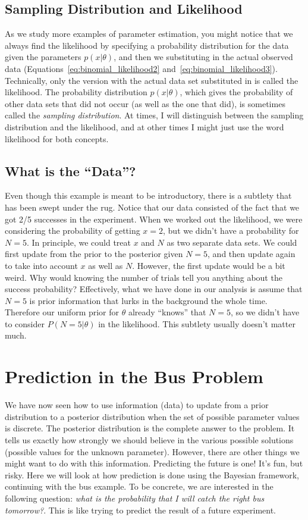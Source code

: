 \subsection{Sampling Distribution and Likelihood}
As we study more examples of parameter estimation, you might notice that
we always find the likelihood by specifying a probability distribution for
the data given the parameters $p(x|\theta)$, and then we substituting in the
actual observed data (Equations~\ref{eq:binomial_likelihood2}
and~\ref{eq:binomial_likelihood3}). Technically, only the version with the
actual data set substituted in is called the likelihood. The probability
distribution $p(x|\theta)$, which gives the probability of other data sets
that did not occur (as well as the one that did), is sometimes called the
{\it sampling distribution}. At times, I will distinguish between the sampling
distribution and the likelihood, and at other times I might just use the word
likelihood for both concepts.

\subsection{What is the ``Data''?}
Even though this example is meant to be introductory, there is a subtlety
that has been swept under the rug. Notice that our data consisted of the fact
that we got 2/5 successes in the experiment. When we worked out the likelihood,
we were considering the probability of getting $x=2$, but we didn't have a
probability for $N=5$. In principle, we could treat $x$ and $N$ as two separate data sets.
We could first update from the prior to the posterior given $N=5$, and then update
again to take into account $x$ as well as $N$. However, the first update would
be a bit weird. Why would knowing the number of trials tell you anything about
the success probability? Effectively, what we have done in our analysis is assume that $N=5$ is prior information that lurks in the background the whole time. Therefore our uniform prior for $\theta$ already ``knows''
that $N=5$, so we didn't have to consider $P(N=5|\theta)$ in the likelihood.
This subtlety usually doesn't matter much.

\section{Prediction in the Bus Problem}\label{sec:prediction_bus_problem}
We have now seen how to use information (data) to update from a prior distribution
to a posterior distribution when the set of possible parameter values is
discrete. The
posterior distribution is the complete answer to the problem. It tells us exactly
how strongly we should believe in the various possible solutions (possible
values for the unknown parameter). However, there
are other things we might want to do with this information. Predicting the future
is one! It's fun, but risky. Here we will look at how prediction is done using the Bayesian
framework, continuing with the bus example. To be concrete, we are interested
in the following question: {\it what is the probability that I will catch the
right bus tomorrow?}. This is like trying to predict the result of a future
experiment.

